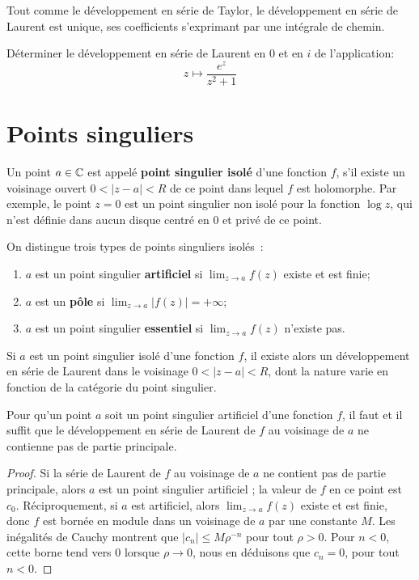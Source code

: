 Tout comme le développement en série de Taylor, le développement en série de Laurent est unique, ses coefficients s'exprimant par une intégrale de chemin. 
 \begin{exercice}
 Déterminer le développement en série de Laurent en $0$ et en $i$ de l'application:
 \[
 z \mapsto \frac{e^z}{z^2+1}
 \]
 \end{exercice}

\section{Points singuliers}

Un point $a \in \mathbb{C}$ est appelé \textbf{point singulier isolé} d'une fonction $f$, s'il existe un voisinage ouvert $0< \lvert z-a \rvert <R$ de ce point dans lequel $f$ est holomorphe. Par exemple, le point $z=0$ est un point singulier non isolé pour la fonction $\log z$, qui n'est définie dans aucun disque centré en $0$ et privé de ce point.

On distingue trois types de points singuliers isolés~:
\begin{enumerate}
\item $a$ est un point singulier \textbf{artificiel} si $\lim_{z \to a} f(z)$ existe et est finie;
\item $a$ est un \textbf{pôle} si $\lim_{z \to a} \lvert f(z) \rvert = + \infty$;
\item $a$ est un point singulier \textbf{essentiel} si $\lim_{z \to a} f(z)$ n'existe pas. 
\end{enumerate}

Si $a$ est un point singulier isolé d'une fonction $f$, il existe alors un développement en série de Laurent dans le voisinage $0< \lvert z-a \rvert <R$, dont la nature varie en fonction de la catégorie du point singulier.

\begin{fprop}\label{prop:riemann}Pour qu'un point $a$ soit un point singulier artificiel d'une fonction $f$, il faut et il suffit que le développement en série de Laurent de $f$ au voisinage de $a$ ne contienne pas de partie principale.
\end{fprop}
\begin{proof}
Si la série de Laurent de $f$ au voisinage de $a$ ne contient pas de partie principale, alors $a$ est un point singulier artificiel ; la valeur de $f$ en ce point est $c_0$. Réciproquement, si $a$ est artificiel, alors $\lim_{z \to a} f(z)$ existe et est finie, donc $f$ est bornée en module dans un voisinage de $a$ par une constante $M$. Les inégalités de Cauchy montrent que $\lvert c_n \rvert \leq M \rho^{-n}$ pour tout $\rho>0$. Pour $n<0$, cette borne tend vers $0$ lorsque $\rho \to 0$, nous en déduisons que $c_n=0$, pour tout $n<0$. 
\end{proof}

